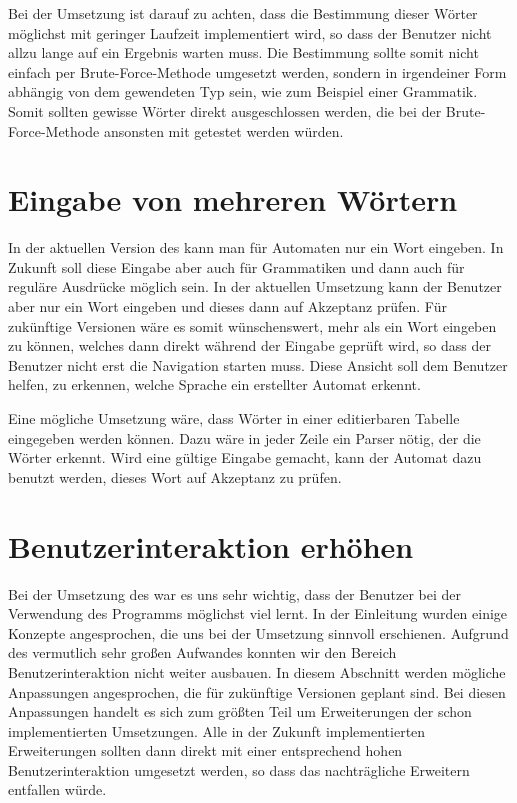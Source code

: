 Bei der Umsetzung ist darauf zu achten, dass die Bestimmung dieser Wörter
möglichst mit geringer Laufzeit implementiert wird, so dass der Benutzer nicht
allzu lange auf ein Ergebnis warten muss. Die Bestimmung sollte somit nicht
einfach per Brute-Force-Methode umgesetzt werden, sondern in irgendeiner Form
abhängig von dem gewendeten Typ sein, wie zum Beispiel einer Grammatik. Somit
sollten gewisse Wörter direkt ausgeschlossen werden, die bei der
Brute-Force-Methode ansonsten mit getestet werden würden.\vspace{10pt}


\section{Eingabe von mehreren Wörtern}\label{PerspectiveMultiplyWordInput}

In der aktuellen Version des \gtitools kann man für Automaten nur ein Wort
eingeben. In Zukunft soll diese Eingabe aber auch für Grammatiken und dann auch
für reguläre Ausdrücke möglich sein. In der aktuellen Umsetzung kann der Benutzer
aber nur ein Wort eingeben und dieses dann auf Akzeptanz prüfen. Für zukünftige
Versionen wäre es somit wünschenswert, mehr als ein Wort eingeben zu können,
welches dann direkt während der Eingabe geprüft wird, so dass der Benutzer
nicht erst die Navigation starten muss. Diese Ansicht soll dem Benutzer helfen,
zu erkennen, welche Sprache ein erstellter Automat erkennt.\vspace{10pt}

Eine mögliche Umsetzung wäre, dass Wörter in einer editierbaren Tabelle
eingegeben werden können. Dazu wäre in jeder Zeile ein Parser nötig, der die
Wörter erkennt. Wird eine gültige Eingabe gemacht, kann der Automat dazu
benutzt werden, dieses Wort auf Akzeptanz zu prüfen.\vspace{10pt}


\section{Benutzerinteraktion erhöhen}\label{PerspectiveInteraction}

Bei der Umsetzung des \gtitools war es uns sehr wichtig, dass der Benutzer bei
der Verwendung des Programms möglichst viel lernt. In der Einleitung wurden
einige Konzepte angesprochen, die uns bei der Umsetzung sinnvoll erschienen.
Aufgrund des vermutlich sehr großen Aufwandes konnten wir den Bereich
Benutzerinteraktion nicht weiter ausbauen. In diesem Abschnitt werden mögliche
Anpassungen angesprochen, die für zukünftige \gtitool Versionen geplant sind. Bei
diesen Anpassungen handelt es sich zum größten Teil um Erweiterungen der schon
implementierten Umsetzungen. Alle in der Zukunft implementierten Erweiterungen
sollten dann direkt mit einer entsprechend hohen Benutzerinteraktion umgesetzt
werden, so dass das nachträgliche Erweitern entfallen würde.\vspace{10pt}


